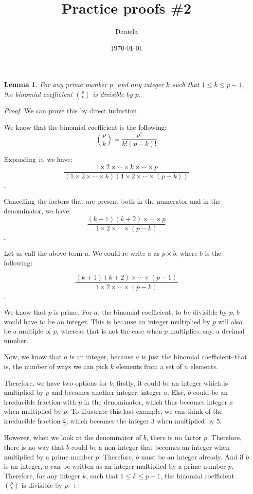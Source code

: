 \documentclass[11pt,reqno,oneside,a4paper]{article}
\title{Practice proofs \#2}
\author{Daniela}
\date{\today}
\newtheorem{lemma}[theorem]{Lemma}
\begin{document}
\maketitle


\begin{lemma} \label{lem:FermatLittleMainLemma}
	For any prime number $p$, and any integer $k$ such that $1 \leq k \leq p-1$, the binomial coefficient $\binom{p}{k}$ is divisible by $p$.
\end{lemma}


\begin{proof}
We can prove this by direct induction

We know that the binomial coefficient is the following:
$$\binom{p}{k} = \frac{p!}{k!(p-k)!}$$

Expanding it, we have:
$$\frac{1 \times 2 \times \cdots \times k \times \cdots \times p}{(1 \times 2 \times \cdots \times k)(1 \times 2 \times \cdots \times (p-k))}$$.

Cancelling the factors that are present both in the numerator and in the denominator, we have:
$$\frac{(k+1)(k+2) \times \cdots \times p}{1 \times 2 \times \cdots \times (p-k)}$$.

Let us call the above term $a$. We could re-write $a$ as $p \times b$, where $b$ is the following:

$$\frac{(k+1)(k+2)\times \cdots \times (p-1)}{1 \times 2 \times \cdots \times (p-k)}$$.

We know that $p$ is prime. For $a$, the binomial coefficient, to be divisible by $p$, $b$ would have to be an integer. This is because an integer multiplied by $p$ will also be a multiple of $p$, whereas that is not the case when $p$ multiplies, say, a decimal number.
 
Now, we know that $a$ is an integer, because $a$ is just the binomial coefficient--that is, the number of ways we can pick $k$ elements from a set of $n$ elements.

Therefore, we have two options for $b$: firstly, it could be an integer which is multiplied by $p$ and becomes another integer, integer $a$. Else, $b$ could be an irreducible fraction with $p$ in the denominator, which thus becomes integer $a$ when multiplied by $p$. To illustrate this last example, we can think of the irreducible fraction $\frac{3}{5}$, which becomes the integer $3$ when multiplied by $5$.

However, when we look at the denominator of $b$, there is no factor $p$. Therefore, there is no way that $b$ could be a non-integer that becomes an integer when multiplied by a prime number $p$. Therefore, $b$ must be an integer already. And if $b$ is an integer, $a$ can be written as an integer multiplied by a prime number $p$. Therefore, for any integer $k$, such that $1 \leq k \leq p - 1$, the binomial coefficient $\binom{p}{k}$ is divisible by $p$.

\end{proof}
\end{document}
